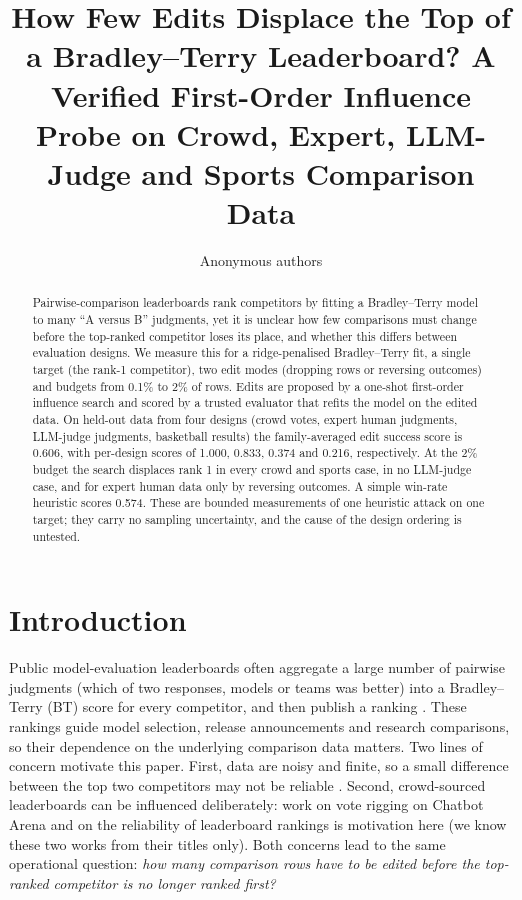 \documentclass{article}
\title{How Few Edits Displace the Top of a Bradley--Terry Leaderboard? A Verified First-Order Influence Probe on Crowd, Expert, LLM-Judge and Sports Comparison Data}
\author{Anonymous authors}
\begin{document}
\maketitle

\begin{abstract}
Pairwise-comparison leaderboards rank competitors by fitting a Bradley--Terry model to many ``A versus B'' judgments, yet it is unclear how few comparisons must change before the top-ranked competitor loses its place, and whether this differs between evaluation designs.
We measure this for a ridge-penalised Bradley--Terry fit, a single target (the rank-1 competitor), two edit modes (dropping rows or reversing outcomes) and budgets from 0.1\% to 2\% of rows.
Edits are proposed by a one-shot first-order influence search and scored by a trusted evaluator that refits the model on the edited data.
On held-out data from four designs (crowd votes, expert human judgments, LLM-judge judgments, basketball results) the family-averaged edit success score is 0.606, with per-design scores of 1.000, 0.833, 0.374 and 0.216, respectively.
At the 2\% budget the search displaces rank 1 in every crowd and sports case, in no LLM-judge case, and for expert human data only by reversing outcomes.
A simple win-rate heuristic scores 0.574.
These are bounded measurements of one heuristic attack on one target; they carry no sampling uncertainty, and the cause of the design ordering is untested.
\end{abstract}

\section{Introduction}
Public model-evaluation leaderboards often aggregate a large number of pairwise judgments (which of two responses, models or teams was better) into a Bradley--Terry (BT) score for every competitor, and then publish a ranking \citep{Bradley1952Rank,Chiang2024Chatbot}.
These rankings guide model selection, release announcements and research comparisons, so their dependence on the underlying comparison data matters.
Two lines of concern motivate this paper.
First, data are noisy and finite, so a small difference between the top two competitors may not be reliable \citep{Gao2021UncertaintyQI}.
Second, crowd-sourced leaderboards can be influenced deliberately: work on vote rigging on Chatbot Arena \citep{Min2025Rigging} and on the reliability of leaderboard rankings \citep{Singh2025Illusion} is motivation here (we know these two works from their titles only).
Both concerns lead to the same operational question: \emph{how many comparison rows have to be edited before the top-ranked competitor is no longer ranked first?}
\end{document}
